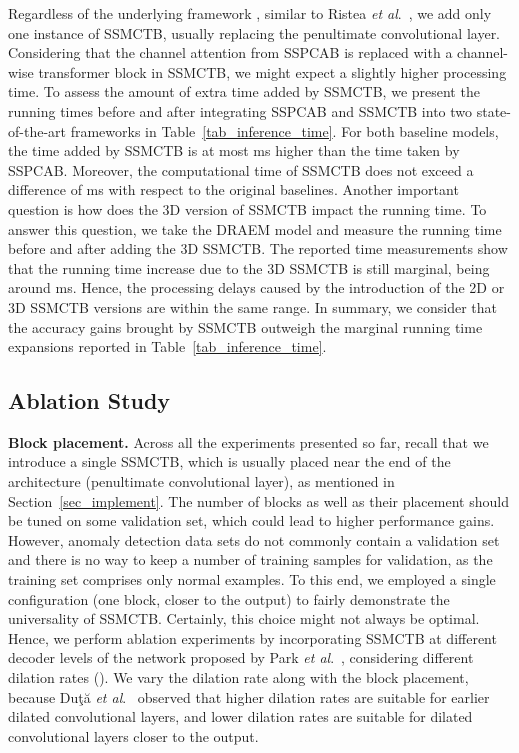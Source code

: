 \documentclass[10pt,journal,compsoc]{IEEEtran}
\newcommand{\etal}{\textit{et al}.}
\begin{document}
Regardless of the underlying framework \cite{Barbalau-ARXIV-2022, Zavrtanik-ICCV-2021, Schulter-ECCV-2022, Georgescu-TPAMI-2021, Liu-ICCV-2021, Park-CVPR-2020, Liu-CVPR-2018,He-CVPR-2022,Vasu-ICCV-2023,Wang-ICDM-2022}, similar to Ristea \etal~\cite{Ristea-CVPR-2022}, we add only one instance of SSMCTB, usually replacing the penultimate convolutional layer. Considering that the channel attention from SSPCAB is replaced with a channel-wise transformer block in SSMCTB, we might expect a slightly higher processing time. To assess the amount of extra time added by SSMCTB, we present the running times before and after integrating SSPCAB and SSMCTB into two state-of-the-art frameworks \cite{Liu-CVPR-2018,Georgescu-TPAMI-2021} in Table~\ref{tab_inference_time}. For both baseline models, the time added by SSMCTB is at most  ms higher than the time taken by SSPCAB. Moreover, the computational time of SSMCTB does not exceed a difference of  ms with respect to the original baselines.
Another important question is how does the 3D version of SSMCTB impact the running time. To answer this question, we take the DRAEM model \cite{Zavrtanik-ICCV-2021} and measure the running time before and after adding the 3D SSMCTB. The reported time measurements show that the running time increase due to the 3D SSMCTB is still marginal, being around  ms. Hence, the processing delays caused by the introduction of the 2D or 3D SSMCTB versions are within the same range. In summary, we consider that the accuracy gains brought by SSMCTB outweigh the marginal running time expansions reported in Table~\ref{tab_inference_time}.

\subsection{Ablation Study}
\label{sec_ablation}

\noindent
\textbf{Block placement.}
Across all the experiments presented so far, recall that we introduce a single SSMCTB, which is usually placed near the end of the architecture (penultimate convolutional layer), as mentioned in Section~\ref{sec_implement}. The number of blocks as well as their placement should be tuned on some validation set, which could lead to higher performance gains. However, anomaly detection data sets do not commonly contain a validation set and there is no way to keep a number of training samples for validation, as the training set comprises only normal examples. To this end, we employed a single configuration (one block, closer to the output) to fairly demonstrate the universality of SSMCTB. Certainly, this choice might not always be optimal. Hence, we perform ablation experiments by incorporating SSMCTB at different decoder levels of the network proposed by Park \etal~\cite{Park-CVPR-2020}, considering different dilation rates (). We vary the dilation rate along with the block placement, because Du\c{t}\u{a} \etal~\cite{Duta-ICCVW-2021} observed that higher dilation rates are suitable for earlier dilated convolutional layers, and lower dilation rates are suitable for dilated convolutional layers closer to the output.
\end{document}
